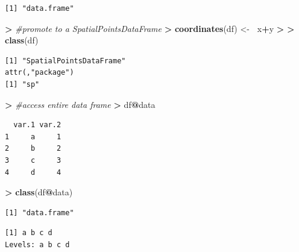 \documentclass[]{krantz}
\makeatletter
\newenvironment{Shaded}{\begin{snugshade}}{\end{snugshade}}
\newcommand{\KeywordTok}[1]{\textcolor[rgb]{0.27,0.27,0.27}{\textbf{#1}}}
\newcommand{\DecValTok}[1]{\textcolor[rgb]{0.06,0.06,0.06}{#1}}
\newcommand{\StringTok}[1]{\textcolor[rgb]{0.5,0.5,0.5}{#1}}
\newcommand{\CommentTok}[1]{\textcolor[rgb]{0.37,0.37,0.37}{\textit{#1}}}
\newcommand{\OperatorTok}[1]{\textcolor[rgb]{0.43,0.43,0.43}{\textbf{#1}}}
\newcommand{\ErrorTok}[1]{\textcolor[rgb]{0.14,0.14,0.14}{\textbf{#1}}}
\newcommand{\NormalTok}[1]{#1}
\newenvironment{kframe}{%
\medskip{}
\setlength{\fboxsep}{.8em}
 \def\at@end@of@kframe{}%
 \ifinner\ifhmode%
  \def\at@end@of@kframe{\end{minipage}}%
  \begin{minipage}{\columnwidth}%
 \fi\fi%
 \def\FrameCommand##1{\hskip\@totalleftmargin \hskip-\fboxsep
 \colorbox{shadecolor}{##1}\hskip-\fboxsep
     \hskip-\linewidth \hskip-\@totalleftmargin \hskip\columnwidth}%
 \MakeFramed {\advance\hsize-\width
   \@totalleftmargin\z@ \linewidth\hsize
   \@setminipage}}%
 {\par\unskip\endMakeFramed%
 \at@end@of@kframe}
\renewenvironment{Shaded}{\begin{kframe}}{\end{kframe}}
\makeatother
\begin{document}
\begin{verbatim}
[1] "data.frame"
\end{verbatim}

\begin{Shaded}
\begin{Highlighting}[]
\OperatorTok{>}\StringTok{ }\CommentTok{#promote to a SpatialPointsDataFrame}
\ErrorTok{>}\StringTok{ }\KeywordTok{coordinates}\NormalTok{(df) <-}\StringTok{ }\ErrorTok{~}\NormalTok{x}\OperatorTok{+}\NormalTok{y}
\OperatorTok{>}\StringTok{ }
\ErrorTok{>}\StringTok{ }\KeywordTok{class}\NormalTok{(df)}
\end{Highlighting}
\end{Shaded}

\begin{verbatim}
[1] "SpatialPointsDataFrame"
attr(,"package")
[1] "sp"
\end{verbatim}

\begin{Shaded}
\begin{Highlighting}[]
\OperatorTok{>}\StringTok{ }\CommentTok{#access entire data frame}
\ErrorTok{>}\StringTok{ }\NormalTok{df}\OperatorTok{@}\NormalTok{data}
\end{Highlighting}
\end{Shaded}

\begin{verbatim}
  var.1 var.2
1     a     1
2     b     2
3     c     3
4     d     4
\end{verbatim}

\begin{Shaded}
\begin{Highlighting}[]
\OperatorTok{>}\StringTok{ }\KeywordTok{class}\NormalTok{(df}\OperatorTok{@}\NormalTok{data)}
\end{Highlighting}
\end{Shaded}

\begin{verbatim}
[1] "data.frame"
\end{verbatim}

\begin{Shaded}
\end{Shaded}

\begin{verbatim}
[1] a b c d
Levels: a b c d
\end{verbatim}
\end{document}
